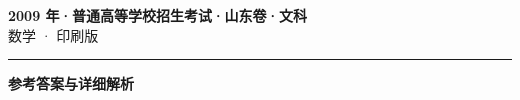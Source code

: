\documentclass[zihao=5, a4paper]{ctexart}
\begin{document}
\begin{center}
  {\Large\bfseries 2009 年·普通高等学校招生考试·山东卷·文科}\\[4pt]
  {\large 数学 · 印刷版}
\end{center}
\medskip
{}

\par\bigskip\hrule\bigskip
{}
\begin{center}{\large\bfseries 参考答案与详细解析}\end{center}
\smallskip

\end{document}
